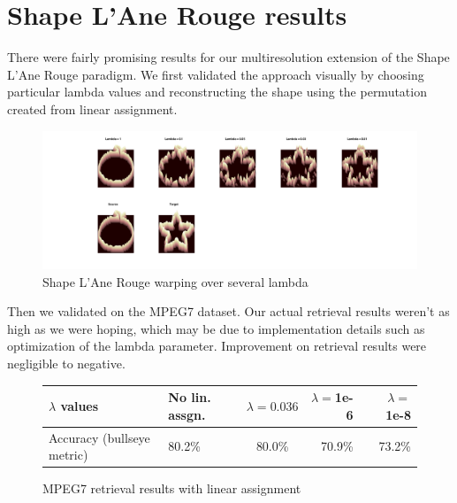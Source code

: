 \documentclass[../tech_report_1.tex]{subfiles}
\begin{document}

\section{Shape L'Ane Rouge results}

There were fairly promising results for our multiresolution extension of the Shape L'Ane Rouge paradigm. We first validated the approach visually by choosing particular lambda values and reconstructing the shape using the permutation created from linear assignment.

\begin{figure}[ht]
	\caption{Shape L'Ane Rouge warping over several lambda}
	\includegraphics[width=\textwidth]{warp}
\end{figure}

Then we validated on the MPEG7 dataset. Our actual retrieval results weren't as high as we were hoping, which may be due to implementation details such as optimization of the lambda parameter. Improvement on retrieval results were negligible to negative.

\begin{figure}[ht]
\caption{MPEG7 retrieval results with linear assignment\label{fig:mpeg7_linassgn}}
\centering
\begin{tabular}{ l | l c r r}
	$\lambda$ values & No lin. assgn. & $\lambda=0.036$ & $\lambda=$1e-6 & $\lambda=$ 1e-8\\
	\hline
	Accuracy (bullseye metric)& 80.2\% & 80.0\% & 70.9\% & 73.2\% \\
\end{tabular}
\end{figure}
\end{document}
